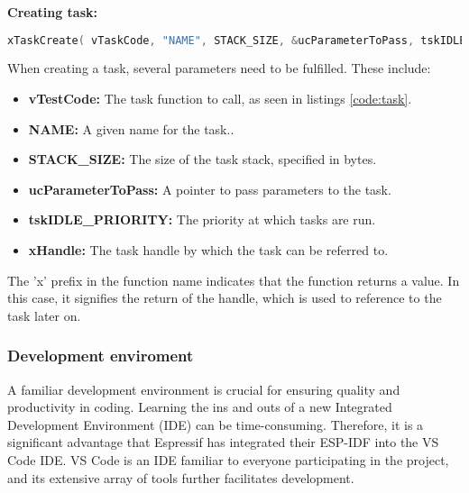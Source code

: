 \documentclass[../report.tex]{subfiles}
\begin{document}
    \textbf{Creating task:}

    \begin{lstlisting}[language=c,caption={Creating a task},label={code:task_create}]
        xTaskCreate( vTaskCode, "NAME", STACK_SIZE, &ucParameterToPass, tskIDLE_PRIORITY, &xHandle );
    \end{lstlisting}

    When creating a task, several parameters need to be fulfilled. These
    include:
    \begin{itemize}
        \item \textbf{vTestCode:} The task function to call, as seen in
        listings \ref{code:task}.
        \item \textbf{NAME:} A given name for the task..
        \item \textbf{STACK\_SIZE:} The size of the task stack, specified in
        bytes.
        \item \textbf{ucParameterToPass:} A pointer to pass parameters to the
        task.
        \item \textbf{tskIDLE\_PRIORITY:} The priority at which tasks are run.
        \item \textbf{xHandle:} The task handle by which the task can be
        referred to.
    \end{itemize}

    The 'x' prefix in the function name indicates that the function returns a
    value. In this case, it signifies the return of the handle, which is used
    to reference to the task later on.

    \subsubsection{Development enviroment}
    A familiar development environment is crucial for ensuring quality and
    productivity in coding. Learning the ins and outs of a new Integrated
    Development Environment (IDE) can be time-consuming. Therefore, it is a
    significant advantage that Espressif has integrated their ESP-IDF into the
    VS Code IDE. VS Code is an IDE familiar to everyone participating in the
    project, and its extensive array of tools further facilitates development.
\end{document}
